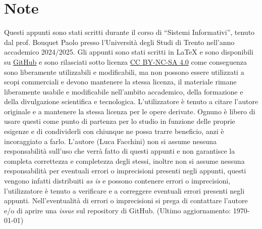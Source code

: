 \vfill
{\footnotesize
    \footnotesize\section*{Note}
    Questi appunti sono stati scritti durante il corso di ``Sistemi Informativi'', tenuto dal prof. Bouquet Paolo presso l'Università degli Studi di Trento nell'anno accademico 2024/2025. Gli appunti sono stati scritti in \LaTeX{} e sono disponibili su \href{https://github.com/lucafano04/appuntisecondoanno}{GitHub} e sono rilasciati sotto licenza \href{https://creativecommons.org/licenses/by-nc-sa/4.0/}{CC BY-NC-SA 4.0} come conseguenza sono liberamente utilizzabili e modificabili, ma non possono essere utilizzati a scopi commerciali e devono mantenere la stessa licenza, il materiale rimane liberamente usabile e modificabile nell'ambito accademico, della formazione e della divulgazione scientifica e tecnologica. L'utilizzatore è tenuto a citare l'autore originale e a mantenere la stessa licenza per le opere derivate. Ognuno è libero di usare questi come punto di partenza per lo studio in funzione delle proprie esigenze e di condividerli con chiunque ne possa trarre beneficio, anzi è incoraggiato a farlo.
    L'autore (Luca Facchini) non si assume nessuna responsabilità sull'uso che verrà fatto di questi appunti e non garantisce la completa correttezza e completezza degli stessi, inoltre non si assume nessuna responsabilità per eventuali errori o imprecisioni presenti negli appunti, questi vengono infatti distribuiti \textit{as is} e possono contenere errori o imprecisioni, l'utilizzatore è tenuto a verificare e a correggere eventuali errori presenti negli appunti. Nell'eventualità di errori o imprecisioni si prega di contattare l'autore e/o di aprire una \textit{issue} sul repository di GitHub. (Ultimo aggiornamento: \today)
}